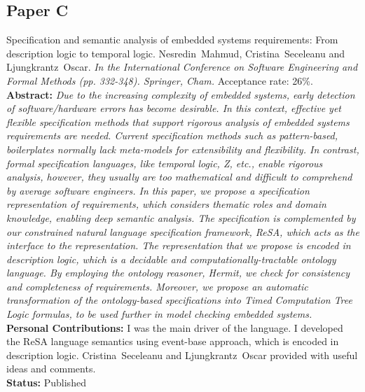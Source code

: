 \subsection*{Paper C}
	Specification and semantic analysis of embedded systems requirements: From description logic to temporal logic. Nesredin~Mahmud, Cristina~Seceleanu and Ljungkrantz~Oscar. \textit{In the International Conference on Software Engineering and Formal Methods (pp. 332-348). Springer, Cham.} Acceptance rate: 26\%.\label{lbl_resadl}\\[6pt]%
	\textbf{Abstract:} \textit{Due to the increasing complexity of embedded systems, early detection of software/hardware errors has become desirable. In this context, effective yet flexible specification methods that support rigorous analysis of embedded systems requirements are needed. Current specification methods such as pattern-based, boilerplates normally lack meta-models for extensibility and flexibility. In contrast, formal specification languages, like temporal logic, Z, etc., enable rigorous analysis, however, they usually are too mathematical and difficult to comprehend by average software engineers. In this paper, we propose a specification representation of requirements, which considers thematic roles and domain knowledge, enabling deep semantic analysis. The specification is complemented by our constrained natural language specification framework, ReSA, which acts as the interface to the representation. The representation that we propose is encoded in description logic, which is a decidable and computationally-tractable ontology language. By employing the ontology reasoner, Hermit, we check for consistency and completeness of requirements. Moreover, we propose an automatic transformation of the ontology-based specifications into Timed Computation Tree Logic formulas, to be used further in model checking embedded systems.}\\[6pt]%
	\textbf{Personal Contributions:} I was the main driver of the language. I developed the ReSA language semantics using event-base approach, which is encoded in description logic. Cristina~Seceleanu and Ljungkrantz~Oscar provided with useful ideas and comments.\\
	\textbf{Status:} Published

